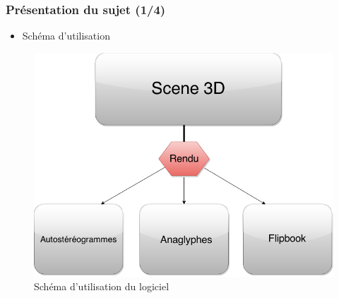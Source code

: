 \documentclass{beamer}
\begin{document}


\begin{frame}

\frametitle{Présentation du sujet (1/4)}

\begin{itemize}[label=$\bullet$]
\item Schéma d'utilisation
\end{itemize}
\begin{figure}
\centering
\includegraphics[scale=0.35]{schema.png} %
\caption{Schéma d'utilisation du logiciel}
\end{figure}

\end{frame}

\end{document}
